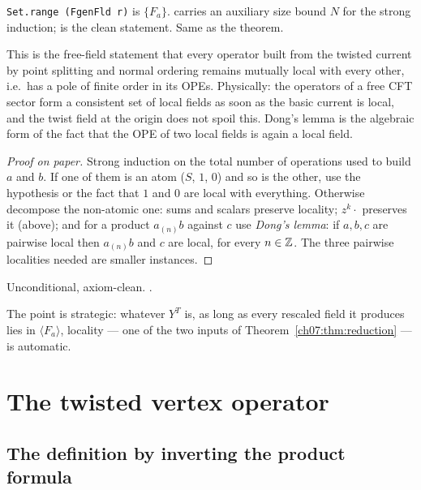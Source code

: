 \begin{dictionary}
\verb|Set.range (FgenFld r)| is $\{F_a\}$.  carries an auxiliary size bound
$N$ for the strong induction;  is the clean statement. Same as the theorem.
\end{dictionary}

\begin{physics}
This is the free-field statement that every operator built from the twisted current by point splitting and normal ordering remains mutually local with every other, i.e.\ has a pole of finite order in its OPEs. Physically: the operators of a free CFT sector form a consistent set of local fields as soon as the basic current is local, and the twist field at the origin does not spoil this. Dong's lemma is the algebraic form of the fact that the OPE of two local fields is again a local field.
\end{physics}

\begin{proof}[Proof on paper]
Strong induction on the total number of operations used to build $a$ and $b$. If one of them is
an atom ($S$, $1$, $0$) and so is the other, use the hypothesis or the fact that $1$ and $0$ are
local with everything. Otherwise decompose the non-atomic one: sums and scalars preserve locality;
$z^k\cdot$ preserves it (above); and for a product $a_{(n)}b$ against $c$ use \emph{Dong's lemma}:
if $a,b,c$ are pairwise local then $a_{(n)}b$ and $c$ are local, for every $n\in{\mathbb{Z}}$. The three
pairwise localities needed are smaller instances.
\end{proof}

\begin{status}
Unconditional, axiom-clean. .
\end{status}

The point is strategic: whatever $Y^T$ is, as long as every rescaled field it produces lies in
$\langle F_a\rangle$, locality --- one of the two inputs of Theorem~\ref{ch07:thm:reduction} ---
is automatic.

\section{The twisted vertex operator}\label{ch07:sec:vertex}

\subsection{The definition by inverting the product formula}\label{ch07:sec:Ywtdef}

